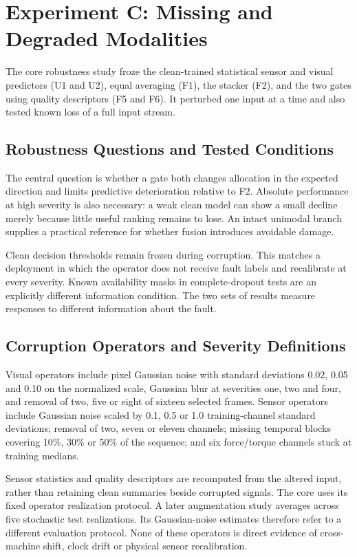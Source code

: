 \section{Experiment C: Missing and Degraded Modalities}
The core robustness study froze the clean-trained statistical sensor and visual predictors (U1 and U2), equal averaging (F1), the stacker (F2), and the two gates using quality descriptors (F5 and F6). It perturbed one input at a time and also tested known loss of a full input stream.

\subsection{Robustness Questions and Tested Conditions}
The central question is whether a gate both changes allocation in the expected direction and limits predictive deterioration relative to F2. Absolute performance at high severity is also necessary: a weak clean model can show a small decline merely because little useful ranking remains to lose. An intact unimodal branch supplies a practical reference for whether fusion introduces avoidable damage.

Clean decision thresholds remain frozen during corruption. This matches a deployment in which the operator does not receive fault labels and recalibrate at every severity. Known availability masks in complete-dropout tests are an explicitly different information condition. The two sets of results measure responses to different information about the fault.

\subsection{Corruption Operators and Severity Definitions}
Visual operators include pixel Gaussian noise with standard deviations 0.02, 0.05 and 0.10 on the normalized scale, Gaussian blur at severities one, two and four, and removal of two, five or eight of sixteen selected frames. Sensor operators include Gaussian noise scaled by 0.1, 0.5 or 1.0 training-channel standard deviations; removal of two, seven or eleven channels; missing temporal blocks covering 10\%, 30\% or 50\% of the sequence; and six force/torque channels stuck at training medians.

Sensor statistics and quality descriptors are recomputed from the altered input, rather than retaining clean summaries beside corrupted signals. The core uses its fixed operator realization protocol. A later augmentation study averages across five stochastic test realizations. Its Gaussian-noise estimates therefore refer to a different evaluation protocol. None of these operators is direct evidence of cross-machine shift, clock drift or physical sensor recalibration.

